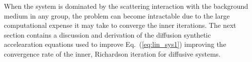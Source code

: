 	
\noindent
	\indent When the system is dominated by the scattering interaction with the background
	medium in any group, the problem can become intractable due to the large computational
	expense it may take to converge the inner iterations.  The next section contains a discussion
	and derivation of the diffusion synthetic accelearation equations used to improve
	Eq.~(\ref{eq:lin_sys1}) improving the convergence rate of the inner, Richardson iteration 
	for diffusive systems.
	
